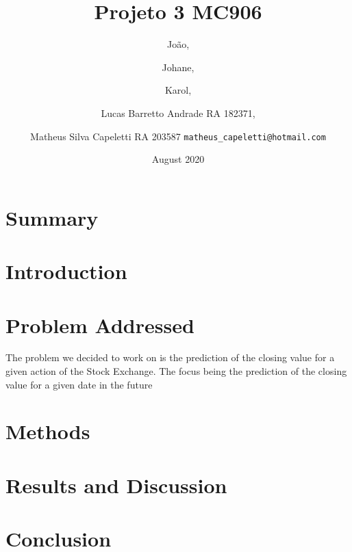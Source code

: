 \documentclass{article}
\title{Projeto 3 MC906}
\author{
    João, 
    \\\and Johane, 
    \\\and Karol, 
    \\\and Lucas Barretto Andrade RA 182371, 
    \\\and Matheus Silva Capeletti RA 203587
    \texttt{matheus\_capeletti@hotmail.com}
}
\date{August 2020}
\begin{document}
\maketitle

\section{Summary}

\section{Introduction}

\section{Problem Addressed}
The problem we decided to work on is the prediction of the closing value for a given action of the Stock Exchange. The focus being the prediction of the closing value for a given date in the future

\section{Methods}

\section{Results and Discussion}

\section{Conclusion}
\end{document}
